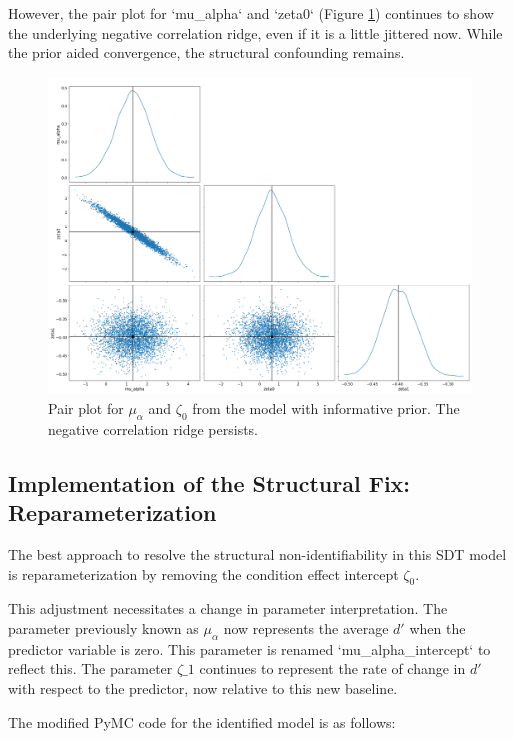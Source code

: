 \documentclass[12pt]{article}
\begin{document}
However, the pair plot for `mu\_alpha` and `zeta0` (Figure \ref{fig:semiid_pair}) continues to show the underlying negative correlation ridge, even if it is a little jittered now. While the prior aided convergence, the structural confounding remains.

\begin{figure}[h!]
    \centering
    \includegraphics[width=\linewidth]{semiid_sdt_pair.png}
    \caption{Pair plot for $\mu_\alpha$ and $\zeta_0$ from the model with informative prior. The negative correlation ridge persists.}
    \label{fig:semiid_pair}
\end{figure}


\subsection*{Implementation of the Structural Fix: Reparameterization}

The best approach to resolve the structural non-identifiability in this SDT model is reparameterization by removing the condition effect intercept $\zeta_0$.

This adjustment necessitates a change in parameter interpretation. The parameter previously known as $\mu_\alpha$ now represents the average $d'$ when the predictor variable is zero. This parameter is renamed `mu\_alpha\_intercept` to reflect this. The parameter $\zeta\_1$ continues to represent the rate of change in $d'$ with respect to the predictor, now relative to this new baseline.

The modified PyMC code for the identified model is as follows:
\end{document}
